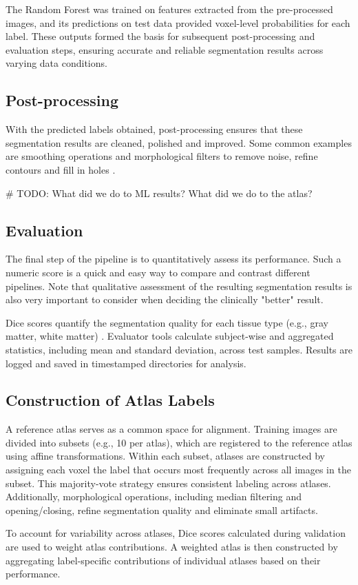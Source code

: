 The Random Forest was trained on features extracted from the pre-processed images, and its predictions on test data provided voxel-level probabilities for each label. These outputs formed the basis for subsequent post-processing and evaluation steps, ensuring accurate and reliable segmentation results across varying data conditions.


\subsection{Post-processing}

With the predicted labels obtained, post-processing ensures that these segmentation results are cleaned, polished and improved. Some common examples are smoothing operations and morphological filters to remove noise, refine contours and fill in holes \cite{b11}.

\# TODO: What did we do to ML results? What did we do to the atlas?

\subsection{Evaluation}

The final step of the pipeline is to quantitatively assess its performance. Such a numeric score is a quick and easy way to compare and contrast different pipelines. Note that qualitative assessment of the resulting segmentation results is also very important to consider when deciding the clinically "better" result.

Dice scores quantify the segmentation quality for each tissue type (e.g., gray matter, white matter) \cite{b12}. Evaluator tools calculate subject-wise and aggregated statistics, including mean and standard deviation, across test samples. Results are logged and saved in timestamped directories for analysis.

\subsection{Construction of Atlas Labels}
A reference atlas serves as a common space for alignment. Training images are divided into subsets (e.g., 10 per atlas), which are registered to the reference atlas using affine transformations. Within each subset, atlases are constructed by assigning each voxel the label that occurs most frequently across all images in the subset. This majority-vote strategy ensures consistent labeling across atlases. Additionally, morphological operations, including median filtering and opening/closing, refine segmentation quality and eliminate small artifacts.

To account for variability across atlases, Dice scores calculated during validation are used to weight atlas contributions. A weighted atlas is then constructed by aggregating label-specific contributions of individual atlases based on their performance.





